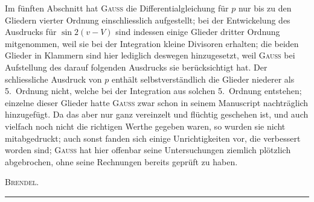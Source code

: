 \clearpage
{}\thispagestyle{VIIPrinted641}
\par\noindent\hspace*{\parindent}Im fünften Abschnitt hat \textsc{Gauss} die Differentialgleichung für \(p\) nur bis zu den Gliedern vierter Ordnung
einschliesslich aufgestellt; bei der Entwickelung des Ausdrucks für \(\sin 2(v-V)\) sind indessen einige
Glieder dritter Ordnung mitgenommen, weil sie bei der Integration kleine Divisoren erhalten; die beiden
Glieder in Klammern sind hier lediglich deswegen hinzugesetzt, weil \textsc{Gauss} bei Aufstellung des darauf
folgenden Ausdrucks sie berücksichtigt hat. Der schliessliche Ausdruck von \(p\) enthält selbstverständlich
die Glieder niederer als 5.~Ordnung nicht, welche bei der Integration aus solchen 5.~Ordnung entstehen;
einzelne dieser Glieder hatte \textsc{Gauss} zwar schon in seinem Manuscript nachträglich hinzugefügt. Da
das aber nur ganz vereinzelt und flüchtig geschehen ist, und auch vielfach noch nicht die richtigen Werthe
gegeben waren, so wurden sie nicht mitabgedruckt; auch sonst fanden sich einige Unrichtigkeiten vor,
die verbessert worden sind; \textsc{Gauss} hat hier offenbar seine Untersuchungen ziemlich plötzlich abgebrochen,
ohne seine Rechnungen bereits geprüft zu haben.
\begin{flushright}\textsc{Brendel}.\end{flushright}
\par\begin{center}\rule{.24\linewidth}{.4pt}\end{center}
\clearpage
\endgroup
